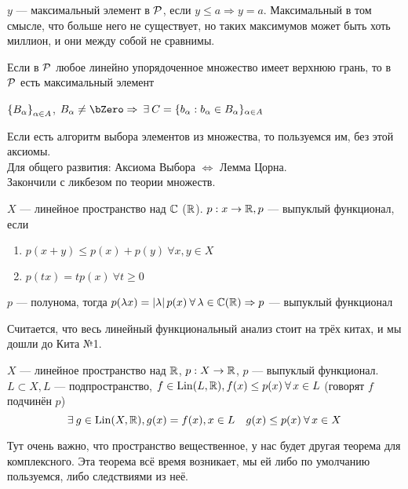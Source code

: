 \documentclass[document]{subfiles}
\begin{document}
\begin{definition}
    $y$ --- максимальный элемент в $\mathcal{P}$, если $y \leq a \Rightarrow y = a$.
    Максимальный в том смысле, что больше него не существует, но таких максимумов может быть хоть миллион, и они между собой не сравнимы.
\end{definition}


\begin{lemma*}[Цорн]
    Если в $\mathcal{P}$ любое линейно упорядоченное множество имеет верхнюю грань, то в $\mathcal{P}$ есть максимальный элемент
\end{lemma*}

\begin{axiom*}[Выбора]
    $\left\{B_\alpha\right\}_{\alpha \in A}$, $B_\alpha \ne \bZero \Rightarrow \: \exists C = \{ b_\alpha: b_\alpha \in B_\alpha \}_{\alpha \in A}$
\end{axiom*}
Если есть алгоритм выбора элементов из множества, то пользуемся им, без этой аксиомы. \\

Для общего развития: Аксиома Выбора $\Leftrightarrow$ Лемма Цорна. \\ 
Закончили с ликбезом по теории множеств.

\begin{definition}
    $X$ --- линейное пространство над $\mathbb{C}$ ($\mathbb{R}$). $p: x \rightarrow \mathbb{R}, p$ --- выпуклый функционал, если 
    \begin{enumerate}
        \item $p(x+y) \leq p(x) + p(y) \: \forall x,y \in X$ 
        \item $p(tx) = tp(x) \: \forall t \geq 0$
    \end{enumerate} 
\end{definition}

\begin{remark}
    $p$ --- полунома, тогда $p(\lambda x) = \abs{\lambda} p(x) \: \forall \lambda \in \bC (\bR) \Rightarrow p$ --- выпуклый функционал
\end{remark}

Считается, что весь линейный функциональный анализ стоит на трёх китах, и мы дошли до Кита №1.
\begin{theorem}
    $X$ --- линейное пространство над $\mathbb{R}$, $p: X \rightarrow \mathbb{R}$, $p$ --- выпуклый функционал.
    $L \subset X, L$ --- подпространство, $f \in \Lin(L, \bR), f(x) \leq p(x) \: \forall x \in L$ (говорят $f$ подчинён $p$)
    \[ \exists g \in \Lin(X, \bR), g(x) = f(x), x \in L \quad g(x) \leq p(x) \: \forall x \in X \]
\end{theorem}
Тут очень важно, что пространство вещественное, у нас будет другая теорема для комплексного. Эта теорема всё время возникает, мы ей либо по умолчанию пользуемся, либо следствиями из неё.
\end{document}
